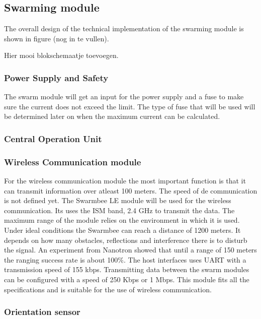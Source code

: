 \documentclass[10pt,a4paper]{article}
\begin{document}
\subsection{Swarming module}

The overall design of the technical implementation of the swarming module is shown in figure (nog in te vullen). 

Hier mooi blokschemaatje toevoegen. 


\subsubsection{Power Supply and Safety}

The swarm module will get an input for the power supply and a fuse to make sure the current does not exceed the limit. The type of fuse that will be used will be determined later on when the maximum current can be calculated. 

\subsubsection{Central Operation Unit}

\subsubsection{Wireless Communication module}

For the wireless communication module the most important function is that it can transmit information over atleast 100 meters. The speed of de communication is not defined yet. The Swarmbee LE module will be used for the wireless communication. Its uses the ISM band, 2.4 GHz to transmit the data. The maximum range of the module relies on the environment in which it is used. Under ideal conditions the Swarmbee can reach a distance of 1200 meters. It depends on how many obstacles, reflections and interference there is to disturb the signal. An experiment from Nanotron showed that until a range of 150 meters the ranging success rate is about 100\%. The host interfaces uses UART with a transmission speed of 155 kbps. Transmitting data between the swarm modules can be configured with a speed of 250 Kbps or 1 Mbps. This module fits all the specifications and is suitable for the use of wireless communication. 

\subsubsection{Orientation sensor}
\end{document}
